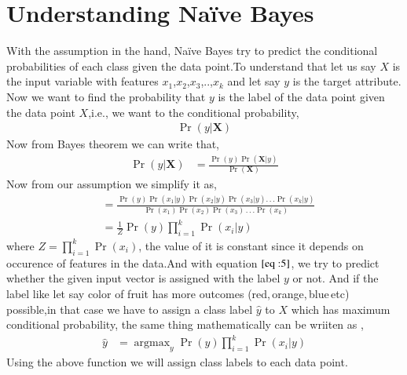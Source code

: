 \documentclass[journal,12pt,onecolumn]{IEEEtran}
\DeclareMathOperator*{\argmax}{argmax}
\providecommand{\pr}[1]{\ensuremath{\Pr\left(#1\right)}}
\theoremstyle{remark}
\numberwithin{equation}{section}
\let\vec\mathbf
\begin{document}
	    \section{Understanding Na\"ive Bayes}
	      With the assumption in the hand, Na\"ive Bayes try to predict the conditional probabilities of each class given the data point.To understand that let us say $X$ is the input variable with features $x_1$,$x_2$,$x_3$,..,$x_k$ and let say $y$ is the target attribute. Now we want to find the probability that $y$ is the label of the data point given the data point $X$,i.e., we want to the conditional probability,
	      \begin{align}
		      \pr{y|\vec{X}}
	      \end{align}
    Now from Bayes theorem we can write that,
	      \begin{align}
		      \pr{y|\vec{X}} &= \frac{\pr{y}\pr{\vec{X}|y}}{\pr{\vec{X}}} 
              \end{align}
     Now from our assumption we simplify it as,
	      \begin{align}
		                     &= \frac{\pr{y}\pr{x_1|y}\pr{x_2|y}\pr{x_3|y}.\,.\,.\pr{x_k|y}}{\pr{x_1}\pr{x_2}\pr{x_3}\,.\,.\,.\pr{x_k}}\\
				     &= \frac{1}{Z}\pr{y}\prod_{i=1}^{k}\pr{x_i|y} \label{eq :5}
	      \end{align}
	      where $Z = \prod_{i=1}^k\pr{x_i}$, the value of it is constant since it depends on occurence of features in the data.And with equation $\eqref{eq :5}$, we try to predict whether the given input vector is assigned with the label $y$ or not. And if the label like let say color of fruit has more outcomes (red,\,orange,\,blue\,etc) possible,in that case we have to assign a class label $\hat{y}$ to $X$ which has maximum conditional probability, the same thing mathematically can be wriiten as ,
	      \begin{align}
                     \hat{y} &= \argmax_y\pr{y}\prod_{i=1}^{k}\pr{x_i|y}
	      \end{align}
          Using the above function we will assign class labels to each data point.
\end{document}
